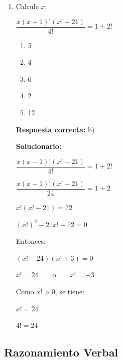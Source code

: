 \begin{enumerate}[resume]
	
	\item Calcule $x$:
	
	$\dfrac{x(x-1)!(x!-21)}{4!}=1+2!$
	
	\begin{enumerate}[label=\alph*)]
		\item 5
		\item 4
		\item 6
		\item 2
		\item 12
	\end{enumerate}
	
	\textbf{Respuesta correcta:} b)
	
	\vspace{2mm}
	\textbf{Solucionario:}\
	
	$\dfrac{x(x-1)!(x!-21)}{4!}=1+2!$
	
	$\dfrac{x(x-1)!(x!-21)}{24}=1+2$
	
	$x!(x!-21)=72$
	
	$(x!)^2-21x!-72=0$
	
	Entonces:
	
	$(x!-24)(x!+3)=0$
	
	$x!=24 \qquad \text{o} \qquad x!=-3$
	
	Como $x!>0$, se tiene:
	
	$x!=24$
	
	$4!=24$
	
	
\end{enumerate}


\subsection*{Razonamiento Verbal}

